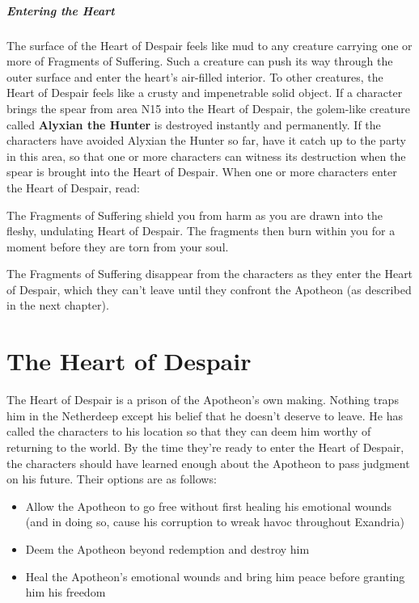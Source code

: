 \documentclass[10pt,a4,twoside,twocolumn,openany,nodeprecatedcode]{dndbook}
\begin{document}
\paragraph{Entering the Heart}
The surface of the Heart of Despair feels like mud to any creature carrying one or more of Fragments of Suffering. Such a creature can push its way through the outer surface and enter the heart's air-filled interior. To other creatures, the Heart of Despair feels like a crusty and impenetrable solid object.
If a character brings the spear from area N15 into the Heart of Despair, the golem-like creature called \textbf{Alyxian the Hunter} is destroyed instantly and permanently. If the characters have avoided Alyxian the Hunter so far, have it catch up to the party in this area, so that one or more characters can witness its destruction when the spear is brought into the Heart of Despair.
When one or more characters enter the Heart of Despair, read:
\begin{DndReadAloud}{}
The Fragments of Suffering shield you from harm as you are drawn into the fleshy, undulating Heart of Despair. The fragments then burn within you for a moment before they are torn from your soul.
\end{DndReadAloud}

The Fragments of Suffering disappear from the characters as they enter the Heart of Despair, which they can't leave until they confront the Apotheon (as described in the next chapter).
\chapter{The Heart of Despair}
The Heart of Despair is a prison of the Apotheon's own making. Nothing traps him in the Netherdeep except his belief that he doesn't deserve to leave. He has called the characters to his location so that they can deem him worthy of returning to the world. By the time they're ready to enter the Heart of Despair, the characters should have learned enough about the Apotheon to pass judgment on his future. Their options are as follows:
\begin{itemize}

\item Allow the Apotheon to go free without first healing his emotional wounds (and in doing so, cause his corruption to wreak havoc throughout Exandria)
\item Deem the Apotheon beyond redemption and destroy him
\item Heal the Apotheon's emotional wounds and bring him peace before granting him his freedom
\end{itemize}
\end{document}
